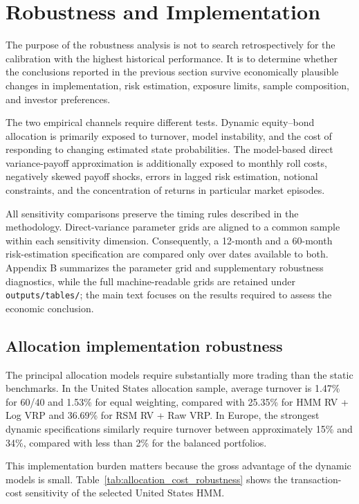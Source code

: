 \section{Robustness and Implementation}
\label{sec:robustness}

The purpose of the robustness analysis is not to search retrospectively for the calibration with the highest historical performance. It is to determine whether the conclusions reported in the previous section survive economically plausible changes in implementation, risk estimation, exposure limits, sample composition, and investor preferences.

The two empirical channels require different tests. Dynamic equity--bond allocation is primarily exposed to turnover, model instability, and the cost of responding to changing estimated state probabilities. The model-based direct variance-payoff approximation is additionally exposed to monthly roll costs, negatively skewed payoff shocks, errors in lagged risk estimation, notional constraints, and the concentration of returns in particular market episodes.

All sensitivity comparisons preserve the timing rules described in the methodology. Direct-variance parameter grids are aligned to a common sample within each sensitivity dimension. Consequently, a 12-month and a 60-month risk-estimation specification are compared only over dates available to both. Appendix B summarizes the parameter grid and supplementary robustness diagnostics, while the full machine-readable grids are retained under \texttt{outputs/tables/}; the main text focuses on the results required to assess the economic conclusion.

\subsection{Allocation implementation robustness}

The principal allocation models require substantially more trading than the static benchmarks. In the United States allocation sample, average turnover is 1.47\% for 60/40 and 1.53\% for equal weighting, compared with 25.35\% for HMM RV + Log VRP and 36.69\% for RSM RV + Raw VRP. In Europe, the strongest dynamic specifications similarly require turnover between approximately 15\% and 34\%, compared with less than 2\% for the balanced portfolios.

This implementation burden matters because the gross advantage of the dynamic models is small. Table~\ref{tab:allocation_cost_robustness} shows the transaction-cost sensitivity of the selected United States HMM.


